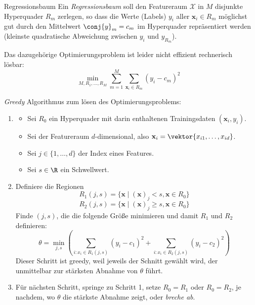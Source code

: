 \begin{defi}{Regressionsbaum}
    Ein \emph{Regressionsbaum} soll den Featureraum $\mathcal{X}$ in $M$ disjunkte Hyperquader $R_m$ zerlegen, so dass die Werte (Labels) $y_i$ aller $\mathbf{x}_i \in R_m$ möglichst gut durch den Mittelwert $\conj{y}_m = c_m$ im Hyperquader repräsentiert werden (kleinste quadratische Abweichung zwischen $y_i$ und $y_{R_m}$).

    Das dazugehörige Optimierungsproblem ist leider nicht effizient rechnerisch lösbar:
    \[
        \min_{M, R_1, \ldots, R_M} \sum_{m=1}^M \sum_{\mathbf{x}_i \in R_m} \left( y_i - c_m \right)^2
    \]

    \emph{Greedy} Algorithmus zum lösen des Optimierungsproblems:
    \begin{enumerate}
        \item
              \begin{itemize}
                  \item Sei $R_0$ ein Hyperquader mit darin enthaltenen Trainingsdaten $(\mathbf{x}_i, y_i)$.
                  \item Sei der Featureraum $d$-dimensional, also $\mathbf{x}_i = \vektor{x_{i1}, \ldots, x_{id}}$.
                  \item Sei $j \in \{1, \ldots, d\}$ der Index eines Features.
                  \item Sei $s \in \R$ ein Schwellwert.
              \end{itemize}
        \item Definiere die Regionen
              \[
                  R_1(j, s) = \{ \mathbf{x} \mid (\mathbf{x})_j < s, \mathbf{x} \in R_0 \}
              \]
              \[
                  R_2(j, s) = \{ \mathbf{x} \mid (\mathbf{x})_j \geq s, \mathbf{x} \in R_0 \}
              \]
              Finde $(j, s)$, die die folgende Größe minimieren und damit $R_1$ und $R_2$ definieren:
              \[
                  \theta = \min_{j, s} \left( \sum_{i:x_i \in R_1 (j, s)} \left( y_i - c_1 \right)^2 + \sum_{i:x_i \in R_2 (j, s)} \left( y_i - c_2 \right)^2 \right)
              \]
              Dieser Schritt ist greedy, weil jeweils der Schnitt gewählt wird, der unmittelbar zur stärksten Abnahme von $\theta$ führt.
        \item Für nächsten Schritt, springe zu Schritt 1, setze $R_0 = R_1$ oder $R_0 = R_2$, je nachdem, wo $\theta$ die stärkste Abnahme zeigt, oder \emph{breche ab}.

\end{enumerate}
\end{defi}
